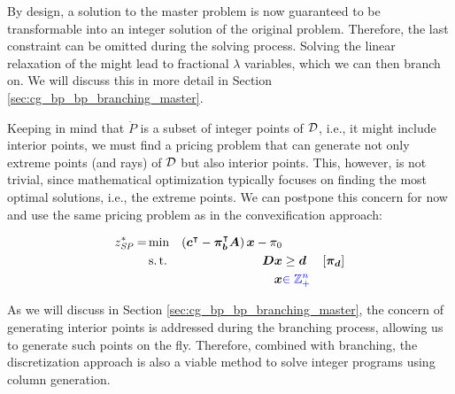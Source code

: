 By design, a solution to the master problem is now guaranteed to be transformable into an integer solution of the original problem. Therefore, the last constraint can be omitted during the solving process. Solving the linear relaxation of the \RMP{} might lead to fractional $\lambda$ variables, which we can then branch on. We will discuss this in more detail in Section \ref{sec:cg_bp_bp_branching_master}.

Keeping in mind that $\ddot{P}$ is a subset of integer points of $\mathcal{D}$, i.e., it might include interior points, we must find a pricing problem that can generate not only extreme points (and rays) of $\mathcal{D}$ but also interior points. This, however, is not trivial, since mathematical optimization typically focuses on finding the most optimal solutions, i.e., the extreme points. We can postpone this concern for now and use the same pricing problem as in the convexification approach:

\begin{equation}
\begin{aligned}
z^*_\SP{} = &\min & \left( \vec{c}\transpose - \vec{\pi}_\vec{b}\transpose \mat{A} \right) \vec{x} - \pi_0 & & \\
&\st & \mat{D} \vec{x} & \geq \vec{d} & \left[\vec{\pi}_\vec{d}\right] \\
&& \vec{x} & {\color{blue} \in \mathbb{Z}_+^n}
\end{aligned}
\end{equation}

As we will discuss in Section \ref{sec:cg_bp_bp_branching_master}, the concern of generating interior points is addressed during the branching process, allowing us to generate such points on the fly. Therefore, combined with branching, the discretization approach is also a viable method to solve integer programs using column generation.
